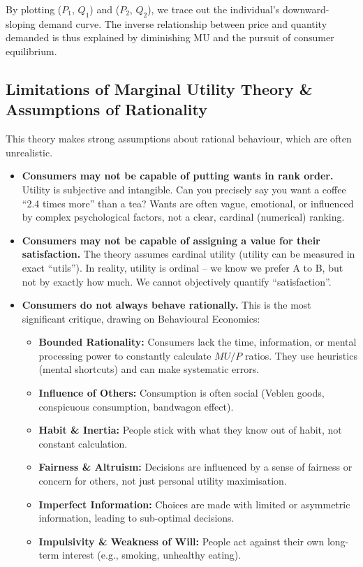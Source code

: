 \documentclass[11pt, a4paper, twoside]{book}
\begin{document}
By plotting ($P_1$, $Q_1$) and ($P_2$, $Q_2$), we trace out the individual's downward-sloping demand curve. The inverse relationship between price and quantity demanded is thus explained by diminishing MU and the pursuit of consumer equilibrium.

\subsection{Limitations of Marginal Utility Theory \& Assumptions of Rationality}

This theory makes strong assumptions about rational behaviour, which are often unrealistic.

\begin{itemize}
  \item \textbf{Consumers may not be capable of putting wants in rank order.} Utility is subjective and intangible. Can you precisely say you want a coffee ``2.4 times more'' than a tea? Wants are often vague, emotional, or influenced by complex psychological factors, not a clear, cardinal (numerical) ranking.
  \item \textbf{Consumers may not be capable of assigning a value for their satisfaction.} The theory assumes cardinal utility (utility can be measured in exact ``utils''). In reality, utility is ordinal -- we know we prefer A to B, but not by exactly how much. We cannot objectively quantify ``satisfaction''.
  \item \textbf{Consumers do not always behave rationally.} This is the most significant critique, drawing on Behavioural Economics:
  \begin{itemize}
    \item \textbf{Bounded Rationality:} Consumers lack the time, information, or mental processing power to constantly calculate $MU/P$ ratios. They use heuristics (mental shortcuts) and can make systematic errors.
    \item \textbf{Influence of Others:} Consumption is often social (Veblen goods, conspicuous consumption, bandwagon effect).
    \item \textbf{Habit \& Inertia:} People stick with what they know out of habit, not constant calculation.
    \item \textbf{Fairness \& Altruism:} Decisions are influenced by a sense of fairness or concern for others, not just personal utility maximisation.
    \item \textbf{Imperfect Information:} Choices are made with limited or asymmetric information, leading to sub-optimal decisions.
    \item \textbf{Impulsivity \& Weakness of Will:} People act against their own long-term interest (e.g., smoking, unhealthy eating).
  \end{itemize}
\end{itemize}
\end{document}
